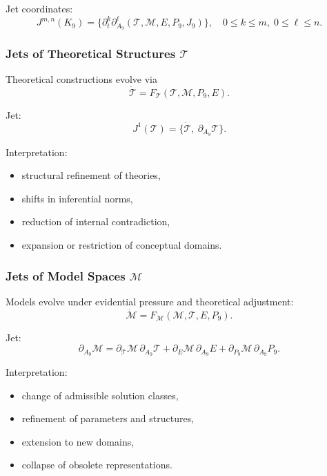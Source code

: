 Jet coordinates:
\[
J^{m,n}(K_9)
=
\{\partial_t^k \partial_{A_9}^\ell
(\mathcal{T},\mathcal{M},E,P_9,J_9)
\},
\quad
0\le k\le m,\;
0\le\ell\le n.
\]


\subsubsection{Jets of Theoretical Structures $\mathcal{T}$}

Theoretical constructions evolve via
\[
\dot{\mathcal{T}}=F_{\mathcal{T}}(\mathcal{T},\mathcal{M},P_9,E).
\]

Jet:
\[
J^1(\mathcal{T})
=
\{\dot{\mathcal{T}},\ \partial_{A_9}\mathcal{T}\}.
\]

Interpretation:
\begin{itemize}
    \item structural refinement of theories,
    \item shifts in inferential norms,
    \item reduction of internal contradiction,
    \item expansion or restriction of conceptual domains.
\end{itemize}


\subsubsection{Jets of Model Spaces $\mathcal{M}$}

Models evolve under evidential pressure and theoretical adjustment:
\[
\dot{\mathcal{M}}=
F_{\mathcal{M}}(\mathcal{M},\mathcal{T},E,P_9).
\]

Jet:
\[
\partial_{A_9}\mathcal{M}
=
\partial_{\mathcal{T}}\mathcal{M}\,\partial_{A_9}\mathcal{T}
+
\partial_{E}\mathcal{M}\,\partial_{A_9}E
+
\partial_{P_9}\mathcal{M}\,\partial_{A_9}P_9.
\]

Interpretation:
\begin{itemize}
    \item change of admissible solution classes,
    \item refinement of parameters and structures,
    \item extension to new domains,
    \item collapse of obsolete representations.
\end{itemize}


